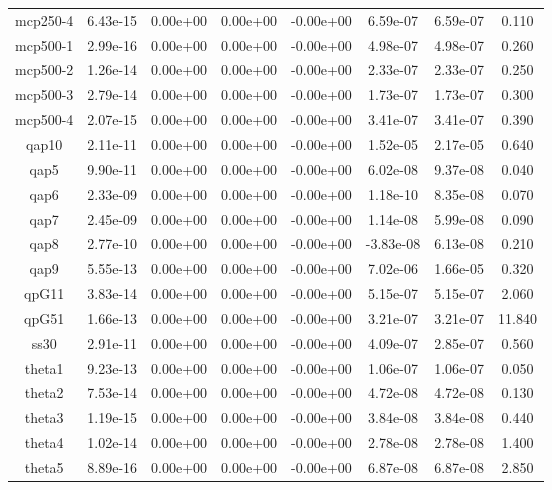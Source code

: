 {{\begin{table}[h]
\begin{center}
{\begin{tabular}{cccccccc}
            mcp250-4 & 6.43e-15 & 0.00e+00 & 0.00e+00 & -0.00e+00 & 6.59e-07 & 6.59e-07 & 0.110 \\ 
            mcp500-1 & 2.99e-16 & 0.00e+00 & 0.00e+00 & -0.00e+00 & 4.98e-07 & 4.98e-07 & 0.260 \\ 
            mcp500-2 & 1.26e-14 & 0.00e+00 & 0.00e+00 & -0.00e+00 & 2.33e-07 & 2.33e-07 & 0.250 \\ 
            mcp500-3 & 2.79e-14 & 0.00e+00 & 0.00e+00 & -0.00e+00 & 1.73e-07 & 1.73e-07 & 0.300 \\ 
            mcp500-4 & 2.07e-15 & 0.00e+00 & 0.00e+00 & -0.00e+00 & 3.41e-07 & 3.41e-07 & 0.390 \\ 
               qap10 & 2.11e-11 & 0.00e+00 & 0.00e+00 & -0.00e+00 & 1.52e-05 & 2.17e-05 & 0.640 \\ 
                qap5 & 9.90e-11 & 0.00e+00 & 0.00e+00 & -0.00e+00 & 6.02e-08 & 9.37e-08 & 0.040 \\ 
                qap6 & 2.33e-09 & 0.00e+00 & 0.00e+00 & -0.00e+00 & 1.18e-10 & 8.35e-08 & 0.070 \\ 
                qap7 & 2.45e-09 & 0.00e+00 & 0.00e+00 & -0.00e+00 & 1.14e-08 & 5.99e-08 & 0.090 \\ 
                qap8 & 2.77e-10 & 0.00e+00 & 0.00e+00 & -0.00e+00 & -3.83e-08 & 6.13e-08 & 0.210 \\ 
                qap9 & 5.55e-13 & 0.00e+00 & 0.00e+00 & -0.00e+00 & 7.02e-06 & 1.66e-05 & 0.320 \\ 
               qpG11 & 3.83e-14 & 0.00e+00 & 0.00e+00 & -0.00e+00 & 5.15e-07 & 5.15e-07 & 2.060 \\ 
               qpG51 & 1.66e-13 & 0.00e+00 & 0.00e+00 & -0.00e+00 & 3.21e-07 & 3.21e-07 & 11.840 \\ 
                ss30 & 2.91e-11 & 0.00e+00 & 0.00e+00 & -0.00e+00 & 4.09e-07 & 2.85e-07 & 0.560 \\ 
              theta1 & 9.23e-13 & 0.00e+00 & 0.00e+00 & -0.00e+00 & 1.06e-07 & 1.06e-07 & 0.050 \\ 
              theta2 & 7.53e-14 & 0.00e+00 & 0.00e+00 & -0.00e+00 & 4.72e-08 & 4.72e-08 & 0.130 \\ 
              theta3 & 1.19e-15 & 0.00e+00 & 0.00e+00 & -0.00e+00 & 3.84e-08 & 3.84e-08 & 0.440 \\ 
              theta4 & 1.02e-14 & 0.00e+00 & 0.00e+00 & -0.00e+00 & 2.78e-08 & 2.78e-08 & 1.400 \\ 
              theta5 & 8.89e-16 & 0.00e+00 & 0.00e+00 & -0.00e+00 & 6.87e-08 & 6.87e-08 & 2.850 \\ 

\end{tabular}}
\end{center}
\end{table}}}

